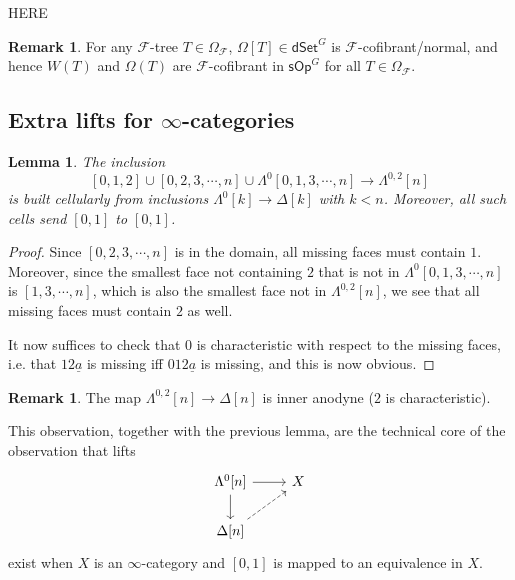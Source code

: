 \documentclass[a4paper,10pt
,draft
]{article}%
\numberwithin{equation}{section}
\numberwithin{figure}{section}
\newtheorem{lemma}[equation]{Lemma}%
\theoremstyle{definition} %
\newtheorem{remark}[equation]{Remark}%
\newcommand{\sOp}{\ensuremath{\mathsf{sOp}}}%
\newcommand{\dSet}{\mathsf{dSet}}
\newcommand{\1}{\ensuremath{\mathbbm 1}}%
\begin{document}
{\color{red} HERE}


\begin{remark}
	For any $\mathcal F$-tree $T \in \Omega_{\mathcal F}$, $\Omega[T] \in \dSet^G$ is $\mathcal F$-cofibrant/normal,
	and hence $W(T)$ and $\Omega(T)$ are $\mathcal F$-cofibrant in $\sOp^G$ for all $T \in \Omega_{\mathcal F}$.
\end{remark}


\subsection{Extra lifts for $\infty$-categories}


\begin{lemma}
The inclusion 
\[[0,1,2] \cup [0,2,3,\cdots,n] \cup 
\Lambda^0[0,1,3,\cdots,n]
 \to \Lambda^{0,2}[n]\]
is built cellularly from inclusions
$\Lambda^0[k] \to \Delta[k]$ with $k<n$.
Moreover, all such cells send $[0,1]$ to $[0,1]$.
\end{lemma}

\begin{proof}
Since $[0,2,3,\cdots,n]$ is in the domain, all missing faces must contain $1$.
Moreover, since the smallest face not containing $2$
that is not in $\Lambda^0[0,1,3,\cdots,n]$ is $[1,3,\cdots,n]$,
which is also the smallest face not in $\Lambda^{0,2}[n]$,
we see that all missing faces must contain $2$ as well.

It now suffices to check that $0$ is characteristic with respect to the missing faces, i.e.
that $12\underline{a}$ is missing iff $012\underline{a}$ is missing, and this is now obvious. 
\end{proof}

\begin{remark}
	The map $\Lambda^{0,2}[n] \to \Delta[n]$ is inner anodyne ($2$ is characteristic).
	
	This observation, together with the previous lemma, are the technical core of the observation that lifts
\[
	\begin{tikzcd}
	\Lambda^{0}[n] \ar{d}  \ar{r} & X
\\
	\Delta[n] \ar[dashed]{ru}
	\end{tikzcd}
\]
exist when $X$ is an $\infty$-category and $[0,1]$ is mapped to an equivalence in $X$.
\end{remark}








\newpage
\appendix
\end{document}
